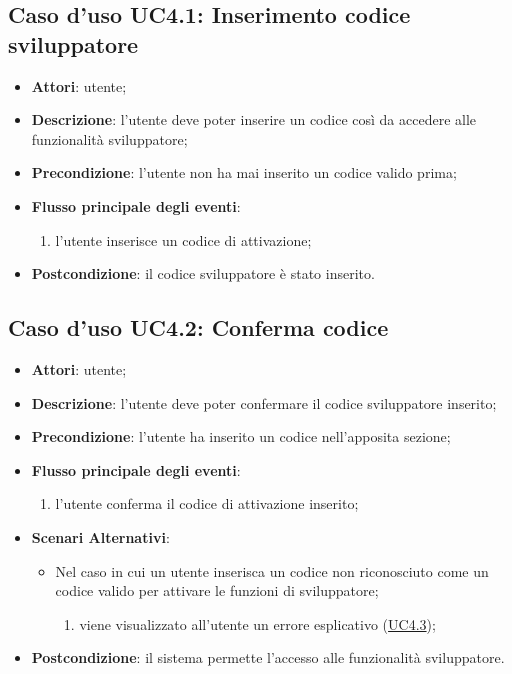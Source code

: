 \documentclass[../AnalisiDeiRequisiti.tex]{subfiles}
\begin{document}
\subsection{Caso d'uso UC4.1: Inserimento codice sviluppatore}

\begin{itemize}
\item \textbf{Attori}: utente;
\item \textbf{Descrizione}: l'utente deve poter inserire un codice così da accedere alle funzionalità sviluppatore; 
      \item \textbf{Precondizione}: l'utente non ha mai inserito un codice valido prima;

        \item \textbf{Flusso principale degli eventi}:
          \begin{enumerate}
          \item l'utente inserisce un codice di attivazione;

      \end{enumerate}
    \item \textbf{Postcondizione}: il codice sviluppatore è stato inserito.
  \end{itemize}
\hypertarget{UC4.2}{}
\subsection{Caso d'uso UC4.2: Conferma codice}

\begin{itemize}
\item \textbf{Attori}: utente;
\item \textbf{Descrizione}: l'utente deve poter confermare il codice sviluppatore inserito; 
      \item \textbf{Precondizione}: l'utente ha inserito un codice nell'apposita sezione;

        \item \textbf{Flusso principale degli eventi}:
          \begin{enumerate}
          \item l'utente conferma il codice di attivazione inserito;

      \end{enumerate}
    \item \textbf{Scenari Alternativi}:
    	\begin{itemize}
    		\item Nel caso in cui un utente inserisca un codice non riconosciuto come un codice valido per attivare le funzioni di sviluppatore;
	      \begin{enumerate}
	          \item viene visualizzato all'utente un errore esplicativo (\hyperlink{UC4.3}{UC4.3});

	      \end{enumerate}
	    \end{itemize}
    \item \textbf{Postcondizione}: il sistema permette l'accesso alle funzionalità sviluppatore.
  \end{itemize}
\hypertarget{UC4.3}{}
\end{document}
